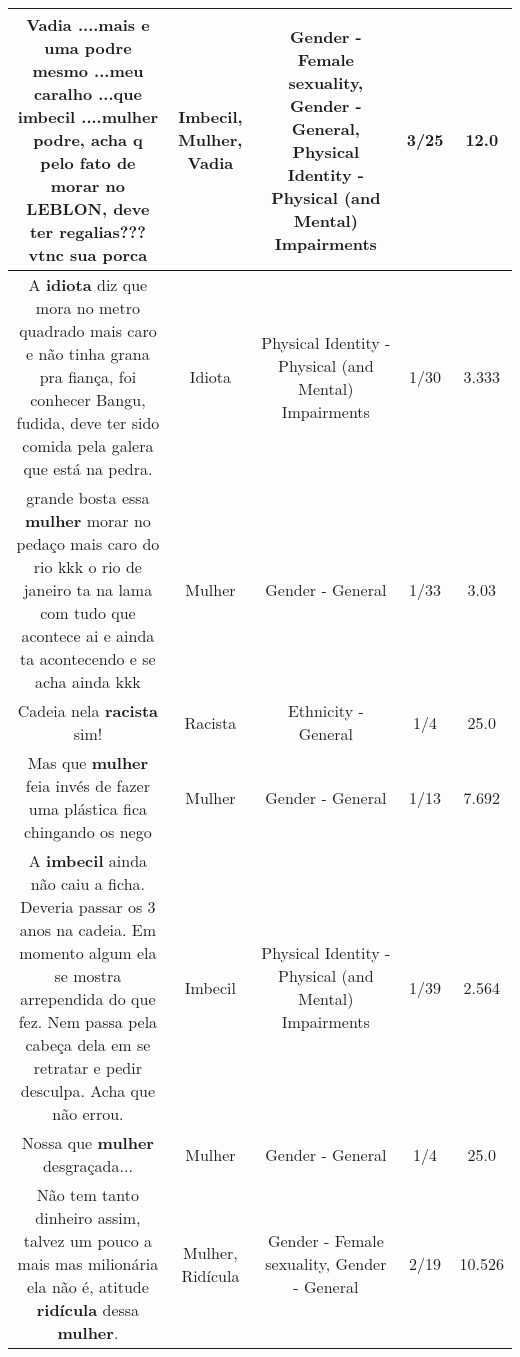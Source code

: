 \documentclass[11pt]{article}
\newlength\mylength
\begin{document}
\begin{center}
\begin{longtable}{|C{.65\mylength}|C{.30\mylength}|C{.12\mylength}|C{.12\mylength}|C{.12\mylength}|}
  \small Vadia ....mais e uma podre mesmo ...meu caralho ...que \textbf{imbecil} ....\textbf{mulher} podre, acha q pelo fato de morar no LEBLON, deve ter regalias???vtnc sua porca\normalsize   & Imbecil, Mulher, Vadia & Gender - Female sexuality, Gender - General, Physical Identity - Physical (and Mental) Impairments & 3/25 & 12.0 \\  \hline
  \small A \textbf{idiota} diz que mora no metro quadrado mais caro e não tinha grana pra fiança, foi conhecer Bangu, fudida, deve ter sido comida pela galera que está na pedra.\normalsize   & Idiota & Physical Identity - Physical (and Mental) Impairments & 1/30 & 3.333 \\  \hline
  \small grande bosta  essa \textbf{mulher} morar no pedaço mais caro do rio kkk o rio de janeiro ta na lama com tudo que acontece ai e ainda ta acontecendo e se acha ainda kkk\normalsize   & Mulher & Gender - General & 1/33 & 3.03 \\  \hline
  \small Cadeia nela \textbf{racista} sim!\normalsize   & Racista & Ethnicity - General & 1/4 & 25.0 \\  \hline
  \small Mas que \textbf{mulher} feia invés de fazer uma plástica fica chingando os nego\normalsize   & Mulher & Gender - General & 1/13 & 7.692 \\  \hline
  \small A \textbf{imbecil} ainda não caiu a ficha. Deveria passar os 3 anos na cadeia. Em momento algum ela se mostra arrependida do que fez. Nem passa pela cabeça dela em  se retratar e pedir desculpa. Acha que não errou.\normalsize   & Imbecil & Physical Identity - Physical (and Mental) Impairments & 1/39 & 2.564 \\  \hline
  \small Nossa que \textbf{mulher} desgraçada...\normalsize   & Mulher & Gender - General & 1/4 & 25.0 \\  \hline
  \small Não tem tanto dinheiro assim, talvez um pouco a mais mas milionária ela não é, atitude \textbf{ridícula} dessa \textbf{mulher}.\normalsize   & Mulher, Ridícula & Gender - Female sexuality, Gender - General & 2/19 & 10.526 \\  \hline

\end{longtable}
\end{center}
\end{document}
